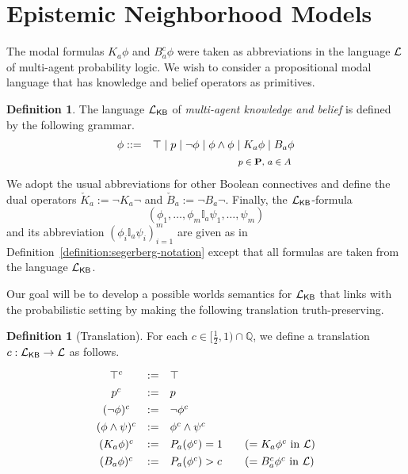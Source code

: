 \documentclass[12pt]{article}
\theoremstyle{definition}
\newtheorem{definition}[theorem]{Definition}
\newcommand{\Rat}{\mathbb{Q}}  %
\newcommand{\Prop}{{\bf P}}    %
\newcommand{\Lang}{{\cal L}}   %
\newcommand{\KB}{{\mathsf{KB}}}                        %
\begin{document}
\section{Epistemic Neighborhood Models}
\label{Section:ENM}

The modal formulas $K_a\phi$ and $B_a^c\phi$ were taken as
abbreviations in the language $\Lang$ of multi-agent probability
logic.  We wish to consider a propositional modal language that has
knowledge and belief operators as primitives.

\begin{definition}
  The language $\Lang_\KB$ of \emph{multi-agent knowledge and belief}
  is defined by the following grammar.
  \begin{eqnarray*}
    \phi & ::= & 
    \top \mid p \mid \neg\phi \mid \phi\land\phi \mid
    K_a\phi \mid B_a\phi
    \\
    &&
    \text{\footnotesize 
      $p\in\Prop$,
      $a\in A$
    }
  \end{eqnarray*}
  We adopt the usual abbreviations for other Boolean connectives and
  define the dual operators $\check K_a:=\lnot K_a\lnot$ and $\check
  B_a:=\lnot B_a\lnot$.  Finally,
  the $\Lang_\KB$-formula
  \[
  (\phi_1,\dots,\phi_m\mathbb{I}_a\psi_1,\dots,\psi_m)
  \]
  and its abbreviation
  $(\phi_i\mathbb{I}_a\psi_i)_{i=1}^m$
  are given
  as in Definition~\ref{definition:segerberg-notation} except that
  all formulas are taken from the language $\Lang_\KB$.
\end{definition}

Our goal will be to develop a possible worlds semantics for
$\Lang_\KB$ that links with the probabilistic setting by making the
following translation truth-preserving.

\begin{definition}[Translation]
  \label{definition:translation}
  For each $c\in[\frac 12,1)\cap\Rat$, we define a translation $c:
  \Lang_\KB \to \Lang$ as follows.
  \[
  \renewcommand{\arraystretch}{1.3}
  \begin{array}{ccl@{\qquad}l}
    \top^c & := & \top
    \\
    p^c & := & p 
    \\
    (\neg \phi)^c & := & \neg \phi^c 
    \\
    (\phi \land \psi)^c & := & \phi^c \land \psi^c 
    \\
    (K_a\phi)^c & := & P_a(\phi^c) = 1
    & (= K_a\phi^c \text{ in } \Lang)
    \\
    (B_a\phi)^c & := & \textstyle P_a(\phi^c) > c
    & (= B_a^c\phi^c \text{ in } \Lang)
  \end{array}
  \]
\end{definition} 
\end{document}
